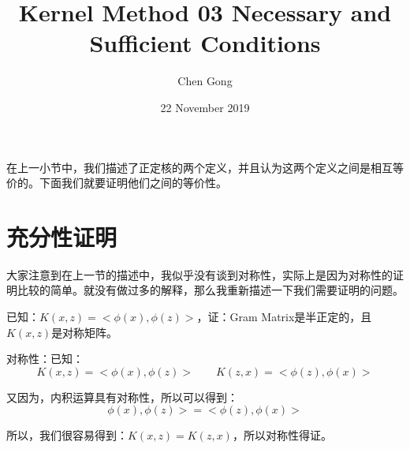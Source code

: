 \documentclass[a4paper]{article}
\title{Kernel Method 03 Necessary and Sufficient Conditions}
\author{Chen Gong}
\date{22 November 2019}
\begin{document}
\maketitle
在上一小节中，我们描述了正定核的两个定义，并且认为这两个定义之间是相互等价的。下面我们就要证明他们之间的等价性。
\section{充分性证明}
大家注意到在上一节的描述中，我似乎没有谈到对称性，实际上是因为对称性的证明比较的简单。就没有做过多的解释，那么我重新描述一下我们需要证明的问题。

已知：$K(x,z) = <\phi(x),\phi(z)>$，证：Gram Matrix是半正定的，且$K(x,z)$是对称矩阵。

对称性：已知：
\begin{equation}
    K(x,z)=<\phi(x),\phi(z)> \qquad K(z,x) = <\phi(z),\phi(x)>
\end{equation}

又因为，内积运算具有对称性，所以可以得到：
\begin{equation}
    \phi(x),\phi(z)> = <\phi(z),\phi(x)>
\end{equation}

所以，我们很容易得到：$K(x,z)=K(z,x)$，所以对称性得证。

~\\
\end{document}
